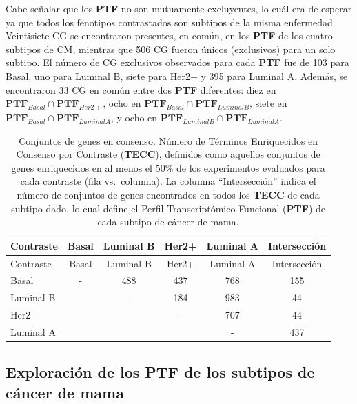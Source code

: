\documentclass[12pt,twoside]{reedthesis}
\begin{document}
Cabe señalar que los \textbf{PTF} no son mutuamente excluyentes, lo cuál era de esperar ya que todos los fenotipos contrastados son subtipos de la misma enfermedad. Veintisiete CG se encontraron presentes, en común, en los \textbf{PTF} de los cuatro subtipos de CM, mientras que 506 CG fueron únicos (exclusivos) para un solo subtipo. El número de CG exclusivos observados para cada \textbf{PTF} fue de 103 para Basal, uno para Luminal B, siete para Her2+ y 395 para Luminal A. Además, se encontraron 33 CG en común entre dos \textbf{PTF} diferentes: diez en \(\boldsymbol{PTF}_{Basal} \cap \boldsymbol{PTF}_{Her2+}\), ocho en \(\boldsymbol{PTF}_{Basal} \cap \boldsymbol{PTF}_{Luminal B}\), siete en \(\boldsymbol{PTF}_{Basal} \cap \boldsymbol{PTF}_{Luminal A}\), y ocho en \(\boldsymbol{PTF}_{Luminal B} \cap \boldsymbol{PTF}_{Luminal A}\).
\begin{longtable}[]{@{}lccccc@{}}
\caption{Conjuntos de genes en consenso. Número de Términos Enriquecidos en Consenso por Contraste (\textbf{TECC}), definidos como aquellos conjuntos de genes enriquecidos en al menos el 50\% de los experimentos evaluados para cada contraste (fila vs.~columna). La columna ``Intersección'' indica el número de conjuntos de genes encontrados en todos los \textbf{TECC} de cada subtipo dado, lo cual define el Perfil Transcriptómico Funcional (\textbf{PTF}) de cada subtipo de cáncer de mama.\label{tab:migsa1}}\tabularnewline
\toprule
Contraste & Basal & Luminal B & Her2+ & Luminal A & Intersección\tabularnewline
\midrule
\endfirsthead
\toprule
Contraste & Basal & Luminal B & Her2+ & Luminal A & Intersección\tabularnewline
\midrule
\endhead
Basal & - & 488 & 437 & 768 & 155\tabularnewline
Luminal B & & - & 184 & 983 & 44\tabularnewline
Her2+ & & & - & 707 & 44\tabularnewline
Luminal A & & & & - & 437\tabularnewline
\bottomrule
\end{longtable}
\hypertarget{exploracion-de-los-ptf-de-los-subtipos-de-cancer-de-mama}{%
\subsection{Exploración de los PTF de los subtipos de cáncer de mama}\label{exploracion-de-los-ptf-de-los-subtipos-de-cancer-de-mama}}

\par
\end{document}
